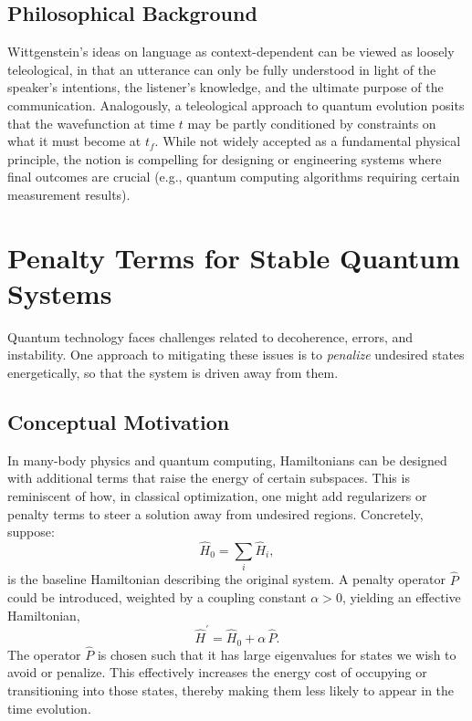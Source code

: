 \documentclass[11pt]{article}
\begin{document}
\subsection{Philosophical Background}
Wittgenstein’s ideas on language as context-dependent can be viewed as loosely teleological, in that an utterance can only be fully understood in light of the speaker's intentions, the listener's knowledge, and the ultimate purpose of the communication. Analogously, a teleological approach to quantum evolution posits that the wavefunction at time $t$ may be partly conditioned by constraints on what it must become at $t_f$. While not widely accepted as a fundamental physical principle, the notion is compelling for designing or engineering systems where final outcomes are crucial (e.g., quantum computing algorithms requiring certain measurement results).

\section{Penalty Terms for Stable Quantum Systems}
\label{sec:penalty-terms}
Quantum technology faces challenges related to decoherence, errors, and instability. One approach to mitigating these issues is to \emph{penalize} undesired states energetically, so that the system is driven away from them. 

\subsection{Conceptual Motivation}
In many-body physics and quantum computing, Hamiltonians can be designed with additional terms that raise the energy of certain subspaces. This is reminiscent of how, in classical optimization, one might add regularizers or penalty terms to steer a solution away from undesired regions. Concretely, suppose:
\begin{equation}
\label{eq:Ham0}
\hat{H}_0 = \sum_i \hat{H}_i,
\end{equation}
is the baseline Hamiltonian describing the original system. A penalty operator $\hat{P}$ could be introduced, weighted by a coupling constant $\alpha > 0$, yielding an effective Hamiltonian,
\begin{equation}
\label{eq:HamPenalty}
\hat{H}^\prime = \hat{H}_0 + \alpha\,\hat{P}.
\end{equation}
The operator $\hat{P}$ is chosen such that it has large eigenvalues for states we wish to avoid or penalize. This effectively increases the energy cost of occupying or transitioning into those states, thereby making them less likely to appear in the time evolution. 
\end{document}
